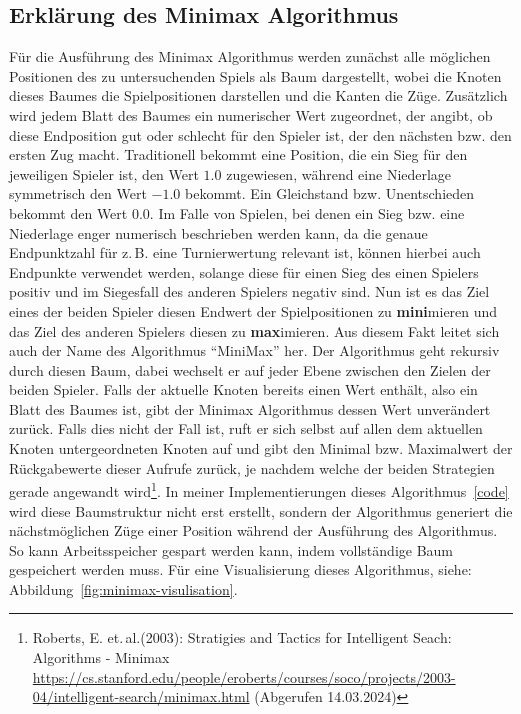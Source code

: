 \documentclass[12pt, a4paper, oneside, openright]{article}
\newcommand \zB{z.\,B.\xspace }
\newcommand \bzw{bzw.\xspace }
\newcommand \etal{et.\,al.\xspace }
\begin{document}
\subsection{Erklärung des Minimax Algorithmus}\label{subsec:erklarung-des-minimax-algorithmus}
Für die Ausführung des Minimax Algorithmus werden zunächst alle möglichen Positionen des zu untersuchenden Spiels als Baum dargestellt, wobei die Knoten dieses Baumes die Spielpositionen darstellen und die Kanten die Züge.
Zusätzlich wird jedem Blatt des Baumes ein numerischer Wert zugeordnet, der angibt, ob diese Endposition gut oder schlecht für den Spieler ist, der den nächsten \bzw den ersten Zug macht.
Traditionell bekommt eine Position, die ein Sieg für den jeweiligen Spieler ist, den Wert $ 1.0 $ zugewiesen, während eine Niederlage symmetrisch den Wert $ -1.0 $ bekommt.
Ein Gleichstand \bzw Unentschieden bekommt den Wert $ 0.0 $.
Im Falle von Spielen, bei denen ein Sieg \bzw eine Niederlage enger numerisch beschrieben werden kann, da die genaue Endpunktzahl für \zB eine Turnierwertung relevant ist, können hierbei auch Endpunkte \undaehnliches verwendet werden, solange diese für einen Sieg des einen Spielers positiv und im Siegesfall des anderen Spielers negativ sind.
Nun ist es das Ziel eines der beiden Spieler diesen Endwert der Spielpositionen zu \textbf{mini}mieren und das Ziel des anderen Spielers diesen zu \textbf{max}imieren.
Aus diesem Fakt leitet sich auch der Name des Algorithmus \enquote{MiniMax} her.
Der Algorithmus geht rekursiv durch diesen Baum, dabei wechselt er auf jeder Ebene zwischen den Zielen der beiden Spieler.
Falls der aktuelle Knoten bereits einen Wert enthält, also ein Blatt des Baumes ist, gibt der Minimax Algorithmus dessen Wert unverändert zurück.
Falls dies nicht der Fall ist, ruft er sich selbst auf allen dem aktuellen Knoten untergeordneten Knoten auf und gibt den Minimal \bzw Maximalwert der Rückgabewerte dieser Aufrufe zurück, je nachdem welche der beiden Strategien gerade angewandt wird\footnote{Roberts, E. \etal (2003): Stratigies and Tactics for Intelligent Seach: Algorithms - Minimax \url{https://cs.stanford.edu/people/eroberts/courses/soco/projects/2003-04/intelligent-search/minimax.html} (Abgerufen 14.03.2024)}.
In meiner Implementierungen dieses Algorithmus~\ref{code} wird diese Baumstruktur nicht erst erstellt, sondern der Algorithmus generiert die nächstmöglichen Züge einer Position während der Ausführung des Algorithmus.
So kann Arbeitsspeicher gespart werden kann, indem vollständige Baum gespeichert werden muss.
Für eine Visualisierung dieses Algorithmus, siehe: Abbildung~\ref{fig:minimax-visulisation}.
\end{document}
